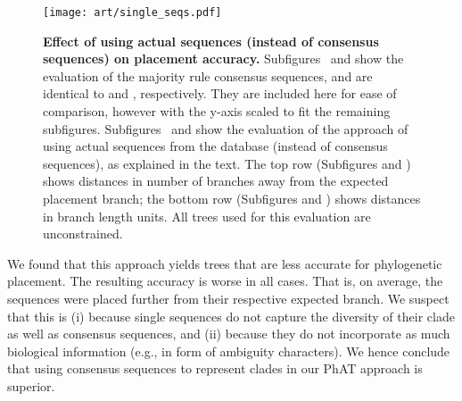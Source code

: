\begin{figure}[hpbt]
    \centering
    \texttt{[image: art/single\_seqs.pdf]}
    \begin{subfigure}{0pt}
        \label{fig:single_seqs:sub:majorities_edge}
    \end{subfigure}
    \begin{subfigure}{0pt}
        \label{fig:single_seqs:sub:single_seq_edge}
    \end{subfigure}
    \begin{subfigure}{0pt}
        \label{fig:single_seqs:sub:majorities_branch}
    \end{subfigure}
    \begin{subfigure}{0pt}
        \label{fig:single_seqs:sub:single_seq_branch}
    \end{subfigure}
    \caption[Effect of using actual sequences on placement accuracy]{
        \textbf{Effect of using actual sequences (instead of consensus sequences) on placement accuracy.}
        Subfigures~
        and 
        show the evaluation of the majority rule consensus sequences, and are identical to
         and ,
        respectively.
        They are included here for ease of comparison, however with the y-axis scaled to fit the remaining subfigures.
        Subfigures~ and 
        show the evaluation of the approach of using actual sequences from the database (instead of consensus sequences),
        as explained in the text.
        The top row (Subfigures  and )
        shows distances in number of branches away from the expected placement branch;
        the bottom row (Subfigures  and )
        shows distances in branch length units.
        All trees used for this evaluation are unconstrained.
    }
    \label{fig:single_seqs}
\end{figure}

We found that this approach yields trees that are less accurate for phylogenetic placement.
The resulting accuracy is worse in all cases.
That is, on average, the sequences were placed further from their respective expected branch.
We suspect that this is (i) because single sequences do not capture the diversity of their clade
as well as consensus sequences,
and (ii) because they do not incorporate as much biological information (e.g., in form of ambiguity characters).
We hence conclude that using consensus sequences to represent clades in our \ac{PhAT} approach is superior.


